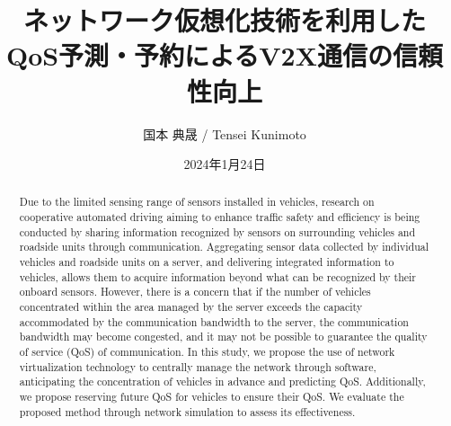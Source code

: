 \documentclass[a4paper,11pt,uplatex]{ujreport}
\title{ネットワーク仮想化技術を利用した\\QoS予測・予約によるV2X通信の信頼性向上}  %
\author{国本 典晟 / Tensei Kunimoto}  %
\date{2024年1月24日}  %
\begin{document}
\maketitle
\clearpage

\begin{abstract}


  Due to the limited sensing range of sensors installed in vehicles, research on cooperative automated driving aiming to enhance traffic safety and efficiency is being conducted by sharing information recognized by sensors on surrounding vehicles and roadside units through communication. Aggregating sensor data collected by individual vehicles and roadside units on a server, and delivering integrated information to vehicles, allows them to acquire information beyond what can be recognized by their onboard sensors. However, there is a concern that if the number of vehicles concentrated within the area managed by the server exceeds the capacity accommodated by the communication bandwidth to the server, the communication bandwidth may become congested, and it may not be possible to guarantee the quality of service (QoS) of communication. In this study, we propose the use of network virtualization technology to centrally manage the network through software, anticipating the concentration of vehicles in advance and predicting QoS. Additionally, we propose reserving future QoS for vehicles to ensure their QoS. We evaluate the proposed method through network simulation to assess its effectiveness.

\end{abstract}
\end{document}
